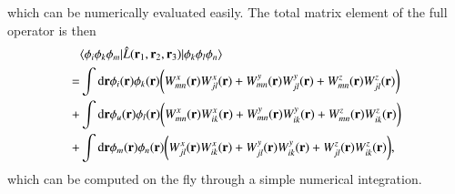 \documentclass[aip,jcp,reprint,noshowkeys,superscriptaddress]{revtex4-1}
\newcommand{\matelem}[3]{\langle #1 | #2 | #3 \rangle}
\newcommand{\bri}[1]{{\bf r}_{#1}}
\begin{document}
which can be numerically evaluated easily. 
The total matrix element of the full operator is then 
\begin{equation}
 \label{eq:l_ijmkln_final}
 \begin{aligned}
 & \matelem{\phi_i \phi_k \phi_m}{\hat{L}(\bri{1},\bri{2},\bri{3})}{\phi_k \phi_l \phi_n} \\
 = & \int \text{d}{\bf r} \phi_i({\bf r})  \phi_k({\bf r}) \bigg( W_{mn}^x({\bf r}) W_{jl}^x({\bf r}) + W_{mn}^y({\bf r}) W_{jl}^y({\bf r}) + W_{mn}^z({\bf r}) W_{jl}^z({\bf r})\bigg) \\
 + & \int \text{d}{\bf r}\phi_u({\bf r})  \phi_l({\bf r}) \bigg( W_{mn}^x({\bf r}) W_{ik}^x({\bf r}) + W_{mn}^y({\bf r}) W_{ik}^y({\bf r}) + W_{mn}^z({\bf r}) W_{ik}^z({\bf r})\bigg) \\
 + & \int \text{d}{\bf r} \phi_m({\bf r})  \phi_n({\bf r}) \bigg( W_{jl}^x({\bf r}) W_{ik}^x({\bf r}) + W_{jl}^y({\bf r}) W_{ik}^y({\bf r}) + W_{jl}^z({\bf r}) W_{ik}^z({\bf r})\bigg), 
 \end{aligned}
\end{equation}
which can be computed on the fly through a simple numerical integration. 
\end{document}
